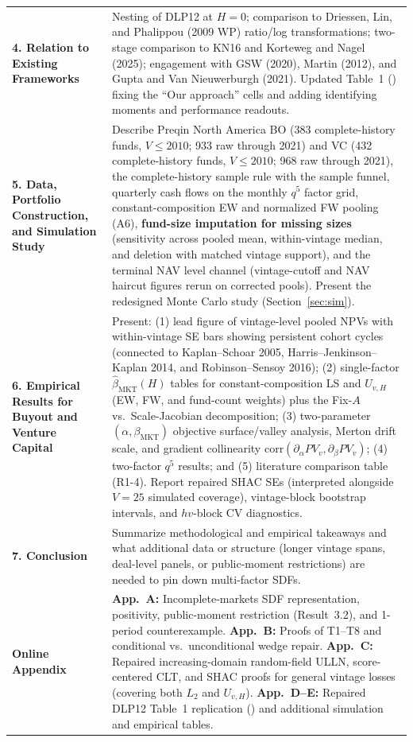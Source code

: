 \documentclass[11pt]{article}
\newcommand{\corr}{\mathrm{corr}}
\newcommand{\code}[1]{\texttt{\detokenize{#1}}}
\begin{document}
{\begin{longtable}{@{}L{4.0cm}L{11.3cm}@{}}
\textbf{4. Relation to Existing Frameworks} & Nesting of DLP12 at $H=0$; comparison to Driessen, Lin, and Phalippou (2009 WP) ratio/log transformations; two-stage comparison to KN16 and Korteweg and Nagel (2025); engagement with GSW (2020), Martin (2012), and Gupta and Van Nieuwerburgh (2021). Updated Table~1 (\code{tab:comparison}) fixing the ``Our approach'' cells and adding identifying moments and performance readouts.\\
\textbf{5. Data, Portfolio Construction, and Simulation Study} & Describe Preqin North America BO (383 complete-history funds, $V\le 2010$; 933 raw through 2021) and VC (432 complete-history funds, $V\le 2010$; 968 raw through 2021), the complete-history sample rule with the sample funnel, quarterly cash flows on the monthly $q^5$ factor grid, constant-composition EW and normalized FW pooling (A6), \textbf{fund-size imputation for missing sizes} (sensitivity across pooled mean, within-vintage median, and deletion with matched vintage support), and the terminal NAV level channel (vintage-cutoff and NAV haircut figures rerun on corrected pools). Present the redesigned Monte Carlo study (Section~\ref{sec:sim}).\\
\textbf{6. Empirical Results for Buyout and Venture Capital} & Present: (1) lead figure of vintage-level pooled NPVs with within-vintage SE bars showing persistent cohort cycles (connected to Kaplan--Schoar 2005, Harris--Jenkinson--Kaplan 2014, and Robinson--Sensoy 2016); (2) single-factor $\hat\beta_{\mathrm{MKT}}(H)$ tables for constant-composition LS and $U_{v,H}$ (EW, FW, and fund-count weights) plus the Fix-$A$ vs.\ Scale-Jacobian decomposition; (3) two-parameter $(\alpha,\beta_{\mathrm{MKT}})$ objective surface/valley analysis, Merton drift scale, and gradient collinearity $\corr(\partial_\alpha PV_v,\partial_\beta PV_v)$; (4) two-factor $q^5$ results; and (5) literature comparison table (R1-4). Report repaired SHAC SEs (interpreted alongside $V=25$ simulated coverage), vintage-block bootstrap intervals, and $hv$-block CV diagnostics.\\
\textbf{7. Conclusion} & Summarize methodological and empirical takeaways and what additional data or structure (longer vintage spans, deal-level panels, or public-moment restrictions) are needed to pin down multi-factor SDFs.\\
\textbf{Online Appendix} & \textbf{App.~A:} Incomplete-markets SDF representation, positivity, public-moment restriction (Result~3.2), and 1-period counterexample. \textbf{App.~B:} Proofs of T1--T8 and conditional vs.\ unconditional wedge repair. \textbf{App.~C:} Repaired increasing-domain random-field ULLN, score-centered CLT, and SHAC proofs for general vintage losses (covering both $L_2$ and $U_{v,H}$). \textbf{App.~D--E:} Repaired DLP12 Table~1 replication (\code{tab:driessen_comparison}) and additional simulation and empirical tables.\\
\bottomrule
\end{longtable}
}
\end{document}
